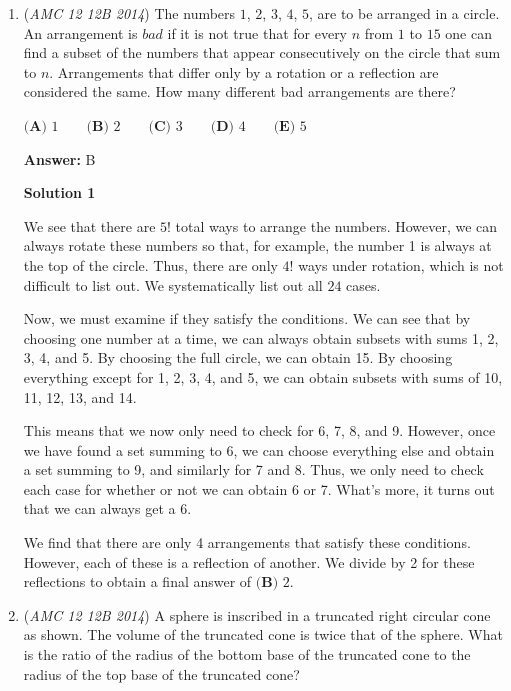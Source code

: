 \begin{enumerate}
 


	\item (\textit{AMC 12 12B 2014}) The numbers $1$, $2$, $3$, $4$, $5$, are to be arranged in a circle.  An arrangement is $\textit{bad}$ if it is not true that for every $n$ from $1$ to $15$ one can find a subset of the numbers that appear consecutively on the circle that sum to $n$.  Arrangements that differ only by a rotation or a reflection are considered the same.  How many different bad arrangements are there?


 $\textbf{(A) }1\qquad\textbf{(B) }2\qquad\textbf{(C) }3\qquad\textbf{(D) }4\qquad\textbf{(E) }5$

 \textbf{Answer: }B



\textbf{Solution 1}

We see that there are $5!$ total ways to arrange the numbers. However, we can always rotate these numbers so that, for example, the number 1 is always at the top of the circle. Thus, there are only $4!$ ways under rotation, which is not difficult to list out. We systematically list out all $24$ cases. 

 Now, we must examine if they satisfy the conditions. We can see that by choosing one number at a time, we can always obtain subsets with sums 1, 2, 3, 4, and 5. By choosing the full circle, we can obtain 15. By choosing everything except for 1, 2, 3, 4, and 5, we can obtain subsets with sums of 10, 11, 12, 13, and 14. 

 This means that we now only need to check for 6, 7, 8, and 9. However, once we have found a set summing to 6, we can choose everything else and obtain a set summing to 9, and similarly for 7 and 8. Thus, we only need to check each case for whether or not we can obtain 6 or 7. What's more, it turns out that we can always get a 6.

 We find that there are only 4 arrangements that satisfy these conditions. However, each of these is a reflection of another. We divide by 2 for these reflections to obtain a final answer of $\boxed{\textbf {(B) }2}$.

 


	\item (\textit{AMC 12 12B 2014}) A sphere is inscribed in a truncated right circular cone as shown. The volume of the truncated cone is twice that of the sphere. What is the ratio of the radius of the bottom base of the truncated cone to the radius of the top base of the truncated cone?


\end{enumerate}
